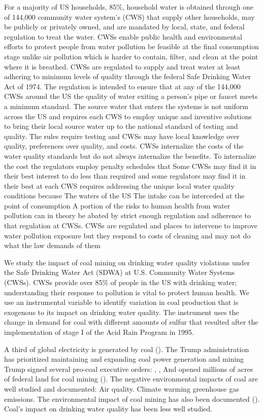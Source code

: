 \documentclass{article}
\begin{document}
For a majority of US households, 85\%, household water is obtained through one of 144,000 community water system's (CWS) that supply other households, may be publicly or privately owned, and are mandated by local, state, and federal regulation to treat the water. CWSs enable public health and environmental efforts to protect people from water pollution be feasible at the final consumption stage unlike air pollution which is harder to contain, filter, and clean at the point where it is breathed. CWSs are regulated to supply and treat water at least adhering to minimum levels of quality through the federal Safe Drinking Water Act of 1974. The regulation is intended to ensure that at any of the 144,000 CWSs around the US the quality of water exiting a person's pipe or faucet meets a minimum standard. The source water that enters the systems is not uniform across the US and requires each CWS to employ unique and inventive solutions to bring their local source water up to the national standard of testing and quality. The rules require testing and CWSs may have local knowledge over quality, preferences over quality, and costs. CWSs internalize the costs of the water quality standards but do not always internalize the benefits. To internalize the cost the regulators employ penalty schedules that Some CWSs may find it in their best interest to do less than required and some regulators may find it in their best  at each CWS requires addressing the unique local water quality conditions because The waters of the US The intake  can be interceded at the point of consumption A portion of the risks to human health from water pollution can in theory be abated by strict enough regulation and adherence to that regulation at CWSs. CWSs are regulated and places to intervene to improve water pollution exposure but they respond to costs of cleaning and may not do what the law demands of them

        
We study the impact of coal mining on drinking water quality violations under the Safe Drinking Water Act (SDWA) at U.S. Community Water Systems (CWSs). CWSs provide over 85\% of people in the US with drinking water; understanding their response to pollution is vital to protect human health. We use an instrumental variable to identify variation in coal production that is exogenous to its impact on drinking water quality. The instrument uses the change in demand for coal with different amounts of sulfur that resulted after the implementation of stage I of the Acid Rain Program in 1995.  
        
A third of global electricity is generated by coal (\cite{IEA2025GER}). The Trump administration has prioritized maintaining and expanding coal power generation and mining Trump signed several pro-coal executive orders: \cite{Trump2025EO14260}, \cite{Trump2025EO14261}, \cite{Trump2025Proc10914} And opened millions of acres of federal land for coal mining (\cite{Daly2025CoalMining}).
The negative environmental impacts of coal are well studied and documented: Air quality.  Climate warming greenhouse gas emissions. The environmental impact of coal mining has also been documented (\cite{muller2011environmental}). Coal's impact on drinking water quality has been less well studied.
\end{document}
